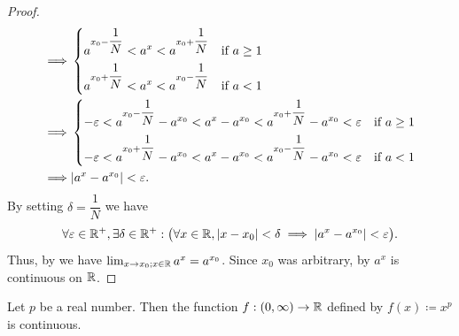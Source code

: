 \begin{proof}
\begin{align*}
    \implies & \begin{dcases}
                 a^{x_0 - \dfrac{1}{N}} < a^{x} < a^{x_0 + \dfrac{1}{N}} & \text{if } a \geq 1 \\
                 a^{x_0 + \dfrac{1}{N}} < a^{x} < a^{x_0 - \dfrac{1}{N}} & \text{if } a < 1
               \end{dcases}                                                          \\
    \implies & \begin{dcases}
                 -\varepsilon < a^{x_0 - \dfrac{1}{N}} - a^{x_0} < a^x - a^{x_0} < a^{x_0 + \dfrac{1}{N}} - a^{x_0} < \varepsilon & \text{if } a \geq 1 \\
                 -\varepsilon < a^{x_0 + \dfrac{1}{N}} - a^{x_0} < a^x - a^{x_0} < a^{x_0 - \dfrac{1}{N}} - a^{x_0} < \varepsilon & \text{if } a < 1
               \end{dcases} \\
    \implies & \abs{a^x - a^{x_0}} < \varepsilon.
  \end{align*}
  By setting \(\delta = \dfrac{1}{N}\) we have
  \[
    \forall \varepsilon \in \mathbb{R}^+, \exists \delta \in \mathbb{R}^+ : \big(\forall x \in \mathbb{R}, \left\lvert x - x_0\right\rvert < \delta \implies \left\lvert a^x - a^{x_0}\right\rvert < \varepsilon\big).
  \]
  Thus, by  we have \(\lim_{x \to x_0 ; x \in \mathbb{R}} a^x = a^{x_0}\).
  Since \(x_0\) was arbitrary, by  \(a^x\) is continuous on \(\mathbb{R}\).
\end{proof}

\begin{prop}\label{i:9.4.11}
  Let \(p\) be a real number.
  Then the function \(f : (0, \infty) \to \mathbb{R}\) defined by \(f(x) \coloneqq x^p\) is continuous.
\end{prop}

